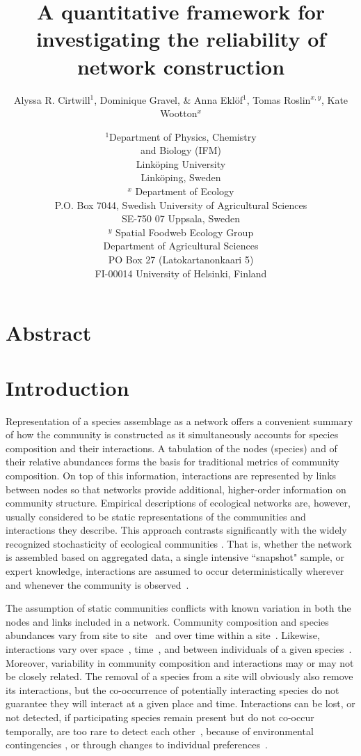 \documentclass[12pt]{article}
\title{A quantitative framework for investigating the reliability of network construction}
\author{Alyssa R. Cirtwill$^{1}$, Dominique Gravel, \&  Anna Ekl\"{o}f$^{1}$, Tomas Roslin$^{x,y}$, Kate Wootton$^{x}$}
\date{\small$^1$Department of Physics, Chemistry\\ 
and Biology (IFM)\\ 
Link\"{o}ping University\\
Link\"{o}ping, Sweden\\
\medskip $^x$ Department of Ecology\\ P.O. Box 7044, Swedish University of Agricultural Sciences \\ SE-750 07 Uppsala, Sweden \\
\medskip $^y$ Spatial Foodweb Ecology Group\\ Department of Agricultural Sciences \\ PO Box 27 (Latokartanonkaari 5)\\ FI-00014 University of Helsinki, Finland \\
}
\begin{document}
 
\maketitle 
\raggedright
\setlength{\parindent}{15pt} 


\section*{Abstract}



\section*{Introduction}

    Representation of a species assemblage as a network offers a convenient summary of how the community is constructed as it simultaneously accounts for species composition and their interactions. A tabulation of the nodes (species) and of their relative abundances forms the basis for traditional metrics of community composition. On top of this information, interactions are represented by links between nodes so that networks provide additional, higher-order information on community structure. Empirical descriptions of ecological networks are, however, usually considered to be static representations of the communities and interactions they describe. This approach contrasts significantly with the widely recognized stochasticity of ecological communities \citep{Gotelli2000}. That is, whether the network is assembled based on aggregated data, a single intensive ``snapshot" sample, or expert knowledge, interactions are assumed to occur deterministically wherever and whenever the community is observed~\citep{Olesen2011a}. 


    The assumption of static communities conflicts with known variation in both  the nodes and links included in a network. Community composition and species abundances vary from site to site~\citep{Baiser2012} and over time within a site~\citep{Olesen2011a}. Likewise, interactions vary over space~\citep{Kitching1987,Baiser2012}, time~\citep{Kitching1987,Olesen2011a}, and between individuals of a given species~\citep{Pires2011a,Fodrie2015,Novak2015}. Moreover, variability in community composition and interactions may or may not be closely related. The removal of a species from a site will obviously also remove its interactions, but the co-occurrence of potentially interacting species do not guarantee they will interact at a given place and time. Interactions can be lost, or not detected, if participating species remain present but do not co-occur temporally, are too rare to detect each other~\citep{Tylianakis2010}, because of environmental contingencies \citep{Poisot2015}, or through changes to individual preferences~\citep{Fodrie2015}. 
\end{document}

